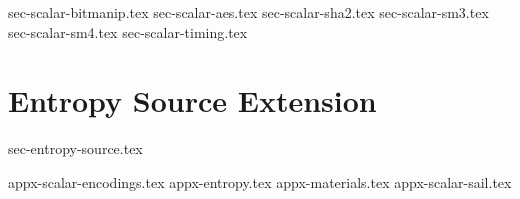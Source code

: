 \documentclass[11pt]{article}
\begin{document}
{sec-scalar-bitmanip.tex}
{sec-scalar-aes.tex}
\clearpage
{sec-scalar-sha2.tex}
{sec-scalar-sm3.tex}
{sec-scalar-sm4.tex}
\clearpage
{sec-scalar-timing.tex}


\newpage
\section{Entropy Source Extension}
\label{sec:randombit}
{sec-entropy-source.tex}


\newpage
\printbibliography


%
%

\newpage
\begin{appendices}
\label{sec:appendix}
{appx-scalar-encodings.tex}
{appx-entropy.tex}
{appx-materials.tex}
{appx-scalar-sail.tex}
\end{appendices}

\end{document}
